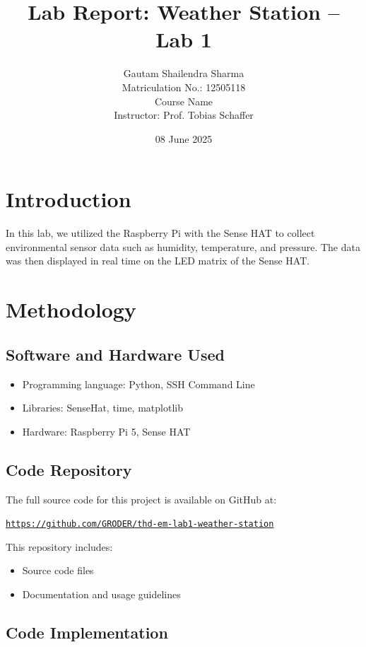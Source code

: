 \documentclass[a4paper,12pt]{article}
\title{Lab Report: \textbf{Weather Station – Lab 1}}
\author{Gautam Shailendra Sharma \\ Matriculation No.: 12505118 \\ Course Name \\ Instructor: Prof. Tobias Schaffer}
\date{08 June 2025}
\begin{document}
\maketitle
\vspace{1cm} 
\section{Introduction}
In this lab, we utilized the Raspberry Pi with the Sense HAT to collect environmental sensor data such as humidity, temperature, and pressure. The data was then displayed in real time on the LED matrix of the Sense HAT.

\section{Methodology}

\subsection{Software and Hardware Used}
\begin{itemize}
    \item Programming language: Python, SSH Command Line
    \item Libraries: SenseHat, time, matplotlib
    \item Hardware: Raspberry Pi 5, Sense HAT
\end{itemize}

\subsection{Code Repository}
The full source code for this project is available on GitHub at:

\begin{center}
\href{https://github.com/GRODER/thd-em-lab1-weather-station}{\texttt{https://github.com/GRODER/thd-em-lab1-weather-station}}
\end{center}

This repository includes:
\begin{itemize}
    \item Source code files
    \item Documentation and usage guidelines
    \vspace{10cm} 
\end{itemize}

\subsection{Code Implementation}
\end{document}
